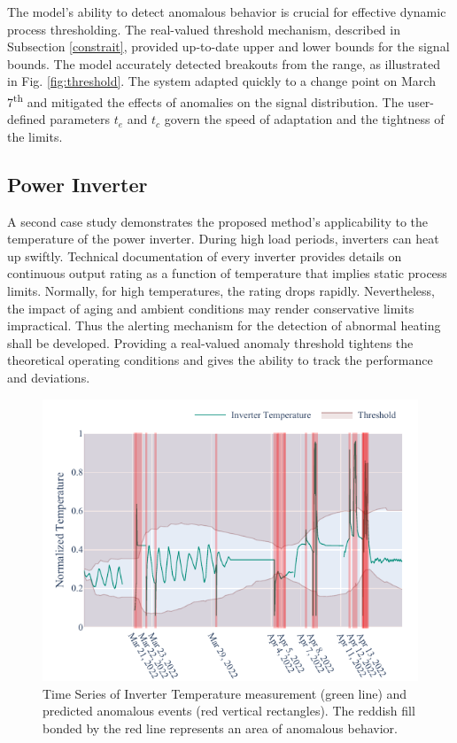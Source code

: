 The model's ability to detect anomalous behavior is crucial for effective dynamic process thresholding. The real-valued threshold mechanism, described in Subsection \ref{constrait}, provided up-to-date upper and lower bounds for the signal bounds. The model accurately detected breakouts from the range, as illustrated in Fig. \ref{fig:threshold}. The system adapted quickly to a change point on March 7\textsuperscript{th} and mitigated the effects of anomalies on the signal distribution. The user-defined parameters $t_e$ and $t_c$ govern the speed of adaptation and the tightness of the limits.

\subsection{Power Inverter}\label{AA:Case2}
A second case study demonstrates the proposed method's applicability to the temperature of the power inverter. During high load periods, inverters can heat up swiftly. Technical documentation of every inverter provides details on continuous output rating as a function of temperature that implies static process limits. Normally, for high temperatures, the rating drops rapidly. Nevertheless, the impact of aging and ambient conditions may render conservative limits impractical. Thus the alerting mechanism for the detection of abnormal heating shall be developed. Providing a real-valued anomaly threshold tightens the theoretical operating conditions and gives the ability to track the performance and deviations. 

\begin{figure}[htbp]
\centerline{\includegraphics{figures/Inverter_Temperature_168_hours_sliding_thresh.pdf}}
\caption{Time Series of Inverter Temperature measurement (green line) and predicted anomalous events (red vertical rectangles). The reddish fill bonded by the red line represents an area of anomalous behavior.}
\label{fig:cs2_threshold}
\end{figure}

